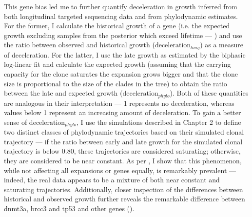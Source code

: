 \begin{figure}[!ht]
	\label{fig:exceeds-within-lifetime}
\end{figure}

\begin{figure}[!ht]
	\label{fig:fraction-clones-exceeding-lifetime}
\end{figure}

This gene bias led me to further quantify deceleration in growth inferred from both longitudinal targeted sequencing data and from phylodynamic estimates. For the former, I calculate the historical growth of a gene (i.e. the expected growth excluding samples from the posterior which exceed lifetime --- ) and use the ratio between observed and historical growth ($\mathrm{deceleration}_{long}$) as a measure of deceleration. For the latter, I use the late growth as estimated by the biphasic log-linear fit and calculate the expected growth (assuming that the carrying capacity for the clone saturates the expansion grows bigger and that the clone size is proportional to the size of the clades in the tree) to obtain the ratio between the late and expected growth ($\mathrm{deceleration}_{phylo}$). Both of these quantities are analogous in their interpretation --- 1 represents no deceleration, whereas values below 1 represent an increasing amount of deceleration. To gain a better sense of $\mathrm{deceleration}_{phylo}$, I use the simulations described in Chapter 2 to define two distinct classes of phylodynamic trajectories based on their simulated clonal trajectory --- if the ratio between early and late growth for the simulated clonal trajectory is below 0.80, these trajectories are considered saturating; otherwise, they are considered to be near constant. As per , I show that this phenomenon, while not affecting all expansions or genes equally, is remarkably prevalent --- indeed, the real data appears to be a mixture of both near constant and saturating trajectories. Additionally, closer inspection of the differences between historical and observed growth further reveals the remarkable difference between \ac{dnmt3a}, \ac{brcc3} and \ac{tp53} and other genes ().


